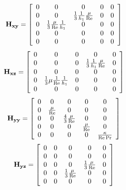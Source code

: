 \begin{equation*}
  {\bf{H}}_{{\bf{xy}}}  = \left[ {\begin{array}{*{20}c}
   0 & 0 & 0 & 0 & 0  \\
   0 & 0 & {\frac{1}{3}\frac{1}{{h_1 }}\frac{\mu }{{{\mathop{\rm Re}\nolimits} }}} & 0 & 0  \\
   0 & {\frac{{\rm{1}}}{3}\frac{\mu }{{{\mathop{\rm Re}\nolimits} }}\frac{1}{{h_1 }}} & 0 & 0 & 0  \\
   0 & 0 & 0 & 0 & 0  \\
   0 & 0 & 0 & 0 & 0  \\
\end{array}} \right]
\end{equation*}
\begin{equation*}
  {\bf{H}}_{{\bf{xz}}}  = \left[ {\begin{array}{*{20}c}
   0 & 0 & 0 & 0 & 0  \\
   0 & 0 & 0 & {\frac{1}{3}\frac{1}{{h_1 }}\frac{\mu }{{{\mathop{\rm Re}\nolimits} }}} & 0  \\
   0 & 0 & 0 & 0 & 0  \\
   0 & {\frac{1}{3}\mu \frac{1}{{{\mathop{\rm Re}\nolimits} }}\frac{1}{{h_1 }}} & 0 & 0 & 0  \\
   0 & 0 & 0 & 0 & 0  \\
\end{array}} \right]
\end{equation*}
\begin{equation*}
  {\bf{H}}_{{\bf{yy}}}  = \left[ {\begin{array}{*{20}c}
   0 & 0 & 0 & 0 & 0  \\
   0 & {\frac{\mu }{{{\mathop{\rm Re}\nolimits} }}} & 0 & 0 & 0  \\
   0 & 0 & {\frac{4}{3}\frac{\mu }{{{\mathop{\rm Re}\nolimits} }}} & 0 & 0  \\
   0 & 0 & 0 & {\frac{\mu }{{{\mathop{\rm Re}\nolimits} }}} & 0  \\
   0 & 0 & 0 & 0 & {\frac{\kappa }{{{\mathop{\rm Re}\nolimits} \Pr }}}  \\
\end{array}} \right]
\end{equation*}
\begin{equation*}
  {\bf{H}}_{{\bf{yz}}}  = \left[ {\begin{array}{*{20}c}
   0 & 0 & 0 & 0 & 0  \\
   0 & 0 & 0 & 0 & 0  \\
   0 & 0 & 0 & {\frac{{\rm{1}}}{{\rm{3}}}\frac{\mu }{{{\mathop{\rm Re}\nolimits} }}} & 0  \\
   0 & 0 & {\frac{1}{3}\frac{\mu }{{{\mathop{\rm Re}\nolimits} }}} & 0 & 0  \\
   0 & 0 & 0 & 0 & 0  \\
\end{array}} \right]
\end{equation*}

